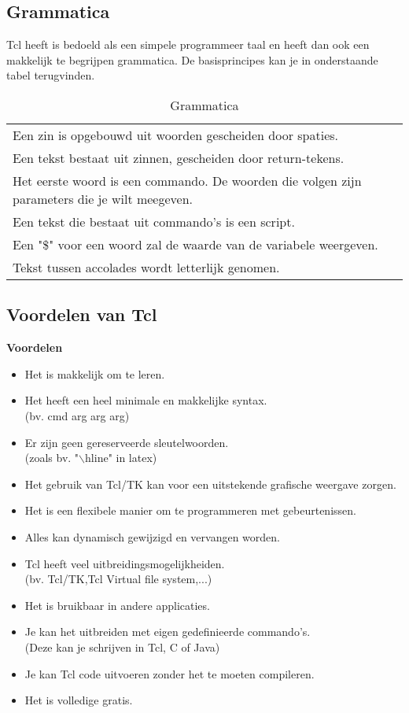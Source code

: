 \documentclass{article}
\begin{document}
\begin{flushleft}
\subsection{Grammatica}
Tcl heeft is bedoeld als een simpele programmeer taal en heeft dan ook een makkelijk te begrijpen grammatica. De basisprincipes kan je in onderstaande tabel terugvinden.\\
\begin{table}[!ht]
\begin{tabular}{|l|}
\hline
Een zin is opgebouwd uit woorden gescheiden door spaties.\\
Een tekst bestaat uit zinnen, gescheiden door return-tekens.\\
Het eerste woord is een commando. De woorden die volgen zijn parameters die je wilt meegeven.\\
Een tekst die bestaat uit commando's is een script.\\
Een "\$" voor een woord zal de waarde van de variabele weergeven.\\
Tekst tussen accolades wordt letterlijk genomen.\\
\hline
\end{tabular}
 \caption{Grammatica}
\end{table}
\newpage
\subsection{Voordelen van Tcl}
\textbf{Voordelen}
\begin{itemize}
\item Het is makkelijk om te leren.\\
\item Het heeft een heel minimale en makkelijke syntax.\\(bv. cmd arg arg arg)
\item Er zijn geen gereserveerde sleutelwoorden.\\(zoals bv. "$\backslash$hline" in latex)
\item Het gebruik van Tcl/TK kan voor een uitstekende grafische weergave zorgen.
\item Het is een flexibele manier om te programmeren met gebeurtenissen.
\item Alles kan dynamisch gewijzigd en vervangen worden.
\item Tcl heeft veel uitbreidingsmogelijkheiden.\\(bv. Tcl/TK,Tcl Virtual file system,...)
\item Het is bruikbaar in andere applicaties.
\item Je kan het uitbreiden met eigen gedefinieerde commando's.\\(Deze kan je schrijven in Tcl, C of Java)
\item Je kan Tcl code uitvoeren zonder het te moeten compileren.
\item Het is volledige gratis.
\end{itemize}


\end{flushleft}
\end{document}
